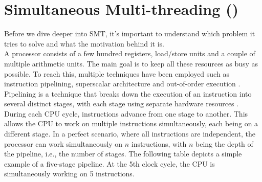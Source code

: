\section{Simultaneous Multi-threading (\checkmark)}
Before we dive deeper into \ac{SMT}, it's important to understand which problem it  
tries to solve and what the motivation behind it is. \\
A processor consists of a few hundred registers, load/store units and a couple of multiple arithmetic units. 
The main goal is to keep all these resources as busy as possible. To reach this, multiple techniques have been 
employed such as instruction pipelining, superscalar architecture and out-of-order execution 
\cite{SMT_Maximizing_on_chip_parallelism}.
Pipelining is a technique that breaks down the execution of an instruction into several distinct 
stages, with each stage using separate hardware resources \cite{SMT_under_the_hood}. During each CPU cycle, 
instructions advance from one stage to another. This allows the CPU to work on multiple instructions 
simultaneously, each being on a different stage. In a perfect scenario, where all instructions are 
independent, the processor can work simultaneously on \begin{math}n\end{math} instructions, 
with \begin{math}n\end{math} being the depth of the pipeline, i.e., the number of stages. 
The following table depicts a simple example of a five-stage pipeline. At the 5th clock cycle, 
the CPU is simultaneously working on 5 instructions.  


